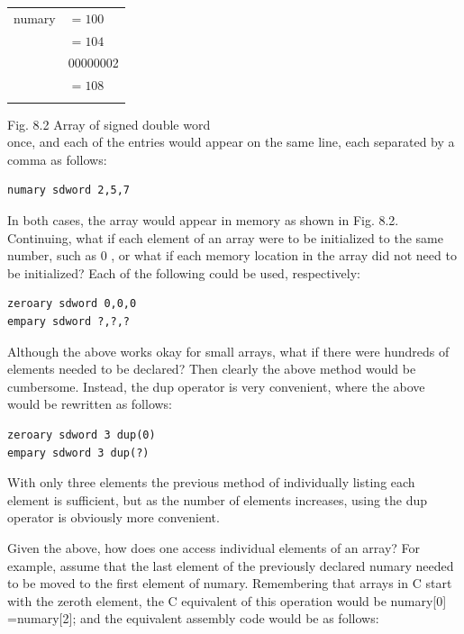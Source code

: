 \documentclass[10pt]{book}
\begin{document}
\begin{center}
\begin{center}
\begin{center}
\begin{tabular}{rl|}
numary & $=100$ \\
 & $=104$ \\
 & 00000002 \\
 & $=108$ \\
 &  \\
\end{tabular}
\end{center}

Fig. 8.2 Array of signed double word\\
once, and each of the entries would appear on the same line, each separated by a comma as follows:


\begin{verbatim}
numary sdword 2,5,7
\end{verbatim}

In both cases, the array would appear in memory as shown in Fig. 8.2.\\
Continuing, what if each element of an array were to be initialized to the same number, such as 0 , or what if each memory location in the array did not need to be initialized? Each of the following could be used, respectively:

\begin{verbatim}
zeroary sdword 0,0,0
empary sdword ?,?,?
\end{verbatim}

Although the above works okay for small arrays, what if there were hundreds of elements needed to be declared? Then clearly the above method would be cumbersome. Instead, the dup operator is very convenient, where the above would be rewritten as follows:

\begin{verbatim}
zeroary sdword 3 dup(0)
empary sdword 3 dup(?)
\end{verbatim}

With only three elements the previous method of individually listing each element is sufficient, but as the number of elements increases, using the dup operator is obviously more convenient.

Given the above, how does one access individual elements of an array? For example, assume that the last element of the previously declared numary needed to be moved to the first element of numary. Remembering that arrays in C start with the zeroth element, the C equivalent of this operation would be numary[0] =numary[2]; and the equivalent assembly code would be as follows:


\end{center}
\end{center}
\end{document}
